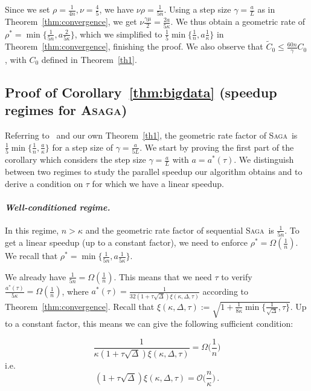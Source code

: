 \documentclass[twoside, 11pt]{article}
\newcommand{\stepsize}{\gamma}
\newcommand{\strongconvex}{\mu}
\newcommand{\overlap}{\tau}
\newcommand{\contraction}{\rho}
\newcommand{\sparsity}{\Delta}
\newcommand{\lipschitz}{L}
\newcommand{\ASAGA}{\textsc{Asaga}}
\newcommand{\SAGA}{\textsc{Saga}}
\begin{document}
Since we set $\contraction = \frac{1}{4n}, \nu = \frac{4}{5}$, we have $\nu \contraction = \frac{1}{5n}$.
Using a step size $\stepsize = \frac{a}{\lipschitz}$ as in Theorem~\ref{thm:convergence}, we get $\nu \frac{\stepsize \strongconvex}{2} = \frac{2a}{5 \kappa}$.
We thus obtain a geometric rate of $\contraction^* = \min \{\frac{1}{5n}, a\frac{2}{5\kappa}\}$, which we simplified to $\frac{1}{5} \min \{\frac{1}{n}, a\frac{1}{\kappa}\}$ in Theorem~\ref{thm:convergence}, finishing the proof.
We also observe that $\tilde C_0 \leq \frac{60n}{\stepsize} C_0$, with $C_0$ defined in Theorem~\ref{th1}.
\hfill\BlackBox

\subsection{Proof of Corollary~\ref{thm:bigdata} (speedup regimes for \ASAGA)} \label{apx:proofASAGAspeedup}
Referring to~\citet{qsaga} and our own Theorem~\ref{th1}, the geometric rate factor of \SAGA\ is $\frac{1}{5}\min\{\frac{1}{n}, \frac{a}{\kappa}\}$ for a step size of $\stepsize = \frac{a}{5L}$. We start by proving the first part of the corollary which considers the step size $\stepsize = \frac{a}{L}$ with $a = a^*(\overlap)$.
We distinguish between two regimes to study the parallel speedup our algorithm obtains and to derive a condition on $\overlap$ for which we have a linear speedup.

\paragraph{\textit{Well-conditioned regime.}}
In this regime, $n > \kappa$ and the geometric rate factor of sequential \SAGA\ is $\frac{1}{5n}$.
To get a linear speedup (up to a constant factor), we need to enforce $\contraction^* = \Omega(\frac{1}{n})$.
We recall that $\contraction^* = \min \{\frac{1}{5n}, a\frac{1}{5\kappa}\}$.

We already have $\frac{1}{5n} = \Omega(\frac{1}{n})$. This means that we need $\overlap$ to verify $\frac{a^*(\overlap)}{5\kappa} = \Omega(\frac{1}{n})$, where $a^*(\overlap) = \frac{1}{32 \left(1+ \overlap  \sqrt \sparsity \right) \xi(\kappa, \sparsity, \overlap)}$ according to Theorem~\ref{thm:convergence}.
Recall that $\xi(\kappa, \sparsity, \overlap) := \sqrt{1 + \frac{1}{8 \kappa}  \min\{\frac{1}{\sqrt{\sparsity}}, \overlap\} }$.
Up to a constant factor, this means we can give the following sufficient condition:

\begin{equation}
\frac{1}{\kappa \left(1+ \overlap  \sqrt \sparsity \right) \xi(\kappa, \sparsity, \overlap)}
= \Omega \Big(\frac{1}{n}\Big)
\end{equation}
i.e.
\begin{equation} \label{eq:SufficientCondition}
\left(1+ \overlap  \sqrt \sparsity \right) \xi(\kappa, \sparsity, \overlap)
= \mathcal{O} \Big( \frac{n}{\kappa} \Big) \, .
\end{equation}
\end{document}
